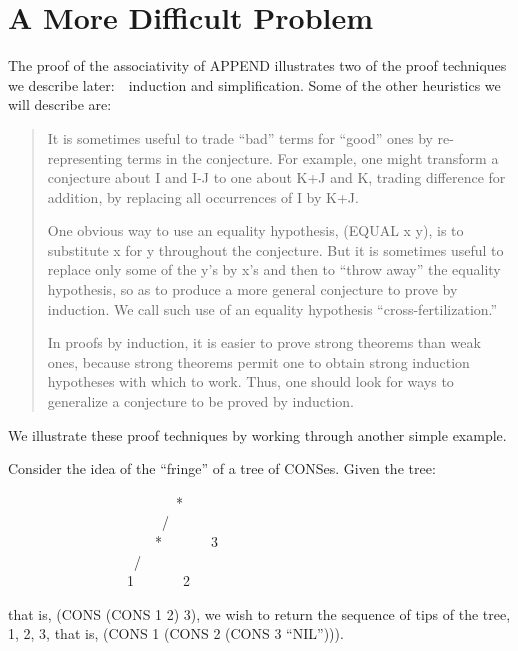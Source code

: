 \documentclass[10pt]{book}
\newenvironment{pubasis}{\begin{flushleft}}{\end{flushleft}}
\newenvironment{pubcrown}{\begin{quote}}{\end{quote}}
\begin{document}
\section{A More Difficult Problem}
The proof of the associativity of APPEND illustrates two of
the proof techniques we describe later:~~induction and
simplification.  Some of the other heuristics we will describe are:
\begin{pubcrown}
It is sometimes useful to trade ``bad'' terms for ``good'' ones by
re-representing terms in the conjecture.  For example,
one might transform a conjecture about
I and I-J to one about K+J and K, trading difference for addition, by
replacing all occurrences of I by K+J.

One obvious way to use an equality hypothesis, (EQUAL x y),
is to substitute x for y throughout the conjecture.  But it is sometimes useful to
replace only some of the y's by x's and then to ``throw away'' the
equality hypothesis, so as to produce a more general conjecture to
prove by induction.  We call such use of an equality hypothesis ``cross-fertilization.''

In proofs by induction, it is
easier to prove strong theorems than weak ones, because strong
theorems permit one to obtain strong induction hypotheses with which to
work.  Thus, one should look for ways to generalize a conjecture
to be proved by induction.
\end{pubcrown}
We illustrate these proof techniques by working through another
simple example.

Consider the idea of the ``fringe''   of a tree of CONSes.
Given the tree:

\begin{pubasis}
~~~~~~~~~~~~~~~~~~~~~~~~*\\
~~~~~~~~~~~~~~~~~~~~~~/~~~\\\
~~~~~~~~~~~~~~~~~~~~*~~~~~~~3\\
~~~~~~~~~~~~~~~~~~/~~~\\\
~~~~~~~~~~~~~~~~1~~~~~~~2\\
\end{pubasis}
that is, (CONS (CONS 1 2) 3), we wish to return the sequence of tips of the tree,
1, 2, 3, that is, (CONS 1 (CONS 2 (CONS 3 ``NIL''))).
\end{document}
